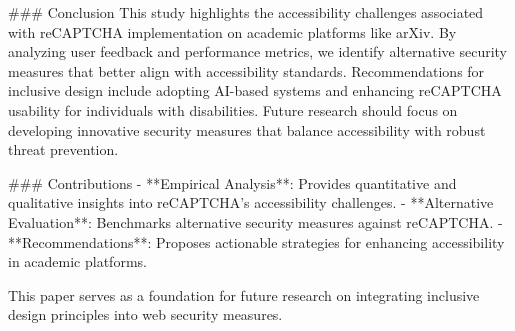 ### Conclusion
This study highlights the accessibility challenges associated with reCAPTCHA implementation on academic platforms like arXiv. By analyzing user feedback and performance metrics, we identify alternative security measures that better align with accessibility standards. Recommendations for inclusive design include adopting AI-based systems and enhancing reCAPTCHA usability for individuals with disabilities. Future research should focus on developing innovative security measures that balance accessibility with robust threat prevention.

### Contributions
- **Empirical Analysis**: Provides quantitative and qualitative insights into reCAPTCHA's accessibility challenges.
- **Alternative Evaluation**: Benchmarks alternative security measures against reCAPTCHA.
- **Recommendations**: Proposes actionable strategies for enhancing accessibility in academic platforms.

This paper serves as a foundation for future research on integrating inclusive design principles into web security measures.